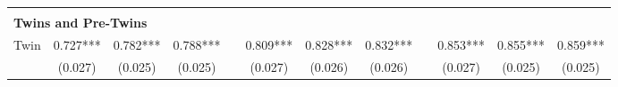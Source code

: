 \begin{landscape}
\begin{table}[htpb!]
\begin{center}
\begin{tabular}{lcccp{2mm}cccp{2mm}ccc}
\begin{footnotesize}\end{footnotesize}&\begin{footnotesize}\end{footnotesize}&\begin{footnotesize}\end{footnotesize}&\begin{footnotesize}\end{footnotesize}&\begin{footnotesize}\end{footnotesize}&\begin{footnotesize}\end{footnotesize}&\begin{footnotesize}\end{footnotesize}&\begin{footnotesize}\end{footnotesize}&\begin{footnotesize}\end{footnotesize}&\begin{footnotesize}\end{footnotesize}&\begin{footnotesize}\end{footnotesize}&\begin{footnotesize}\end{footnotesize}\\\multicolumn{12}{l}{\textbf{Twins and Pre-Twins}}\\ 
Twin&0.727***&0.782***&0.788***&&0.809***&0.828***&0.832***&&0.853***&0.855***&0.859***\\
&(0.027)&(0.025)&(0.025)&&(0.027)&(0.026)&(0.026)&&(0.027)&(0.025)&(0.025)\\

\end{tabular}
\end{center}
\end{table}
\end{landscape}
